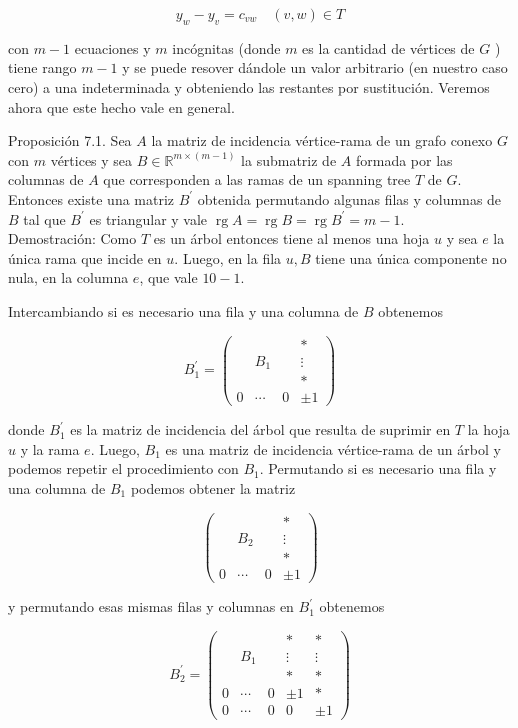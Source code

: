\documentclass[10pt]{article}
\begin{document}
$$
y_{w}-y_{v}=c_{v w} \quad(v, w) \in T
$$

con $m-1$ ecuaciones y $m$ incógnitas (donde $m$ es la cantidad de vértices de $G$ ) tiene rango $m-1$ y se puede resover dándole un valor arbitrario (en nuestro caso cero) a una indeterminada y obteniendo las restantes por sustitución. Veremos ahora que este hecho vale en general.

Proposición 7.1. Sea $A$ la matriz de incidencia vértice-rama de un grafo conexo $G$ con $m$ vértices y sea $B \in \mathbb{R}^{m \times(m-1)}$ la submatriz de $A$ formada por las columnas de $A$ que corresponden a las ramas de un spanning tree $T$ de $G$. Entonces existe una matriz $B^{\prime}$ obtenida permutando algunas filas y columnas de $B$ tal que $B^{\prime}$ es triangular y vale $\operatorname{rg} A=\operatorname{rg} B=\operatorname{rg} B^{\prime}=m-1$.\\
Demostración: Como $T$ es un árbol entonces tiene al menos una hoja $u$ y sea $e$ la única rama que incide en $u$. Luego, en la fila $u, B$ tiene una única componente no nula, en la columna $e$, que vale $10-1$.

Intercambiando si es necesario una fila y una columna de $B$ obtenemos

$$
B_{1}^{\prime}=\left(\begin{array}{cccc} 
& & & * \\
& B_{1} & & \vdots \\
& & & * \\
0 & \cdots & 0 & \pm 1
\end{array}\right)
$$

donde $B_{1}^{\prime}$ es la matriz de incidencia del árbol que resulta de suprimir en $T$ la hoja $u$ y la rama $e$. Luego, $B_{1}$ es una matriz de incidencia vértice-rama de un árbol y podemos repetir el procedimiento con $B_{1}$. Permutando si es necesario una fila y una columna de $B_{1}$ podemos obtener la matriz

$$
\left(\begin{array}{cccc} 
& & & * \\
& B_{2} & & \vdots \\
& & & * \\
0 & \cdots & 0 & \pm 1
\end{array}\right)
$$

y permutando esas mismas filas y columnas en $B_{1}^{\prime}$ obtenemos

$$
B_{2}^{\prime}=\left(\begin{array}{ccccc} 
& & & * & * \\
& B_{1} & & \vdots & \vdots \\
& & & * & * \\
0 & \cdots & 0 & \pm 1 & * \\
0 & \cdots & 0 & 0 & \pm 1
\end{array}\right)
$$
\end{document}
